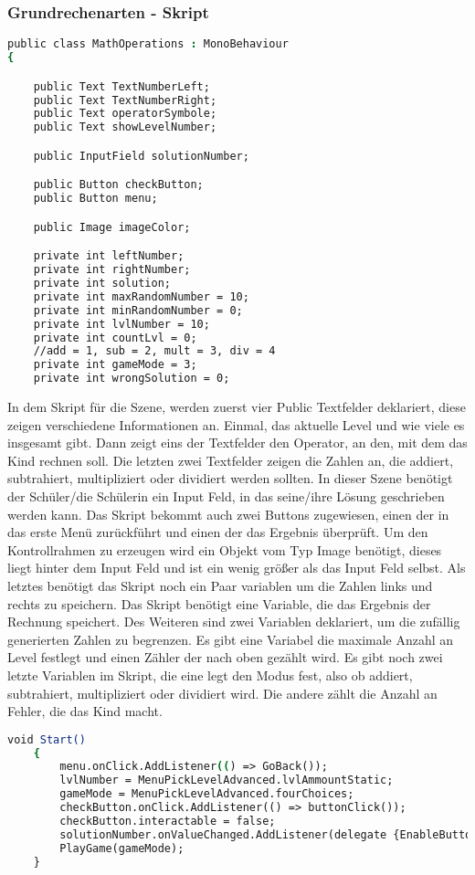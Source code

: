 \subsubsection{Grundrechenarten - Skript}
\begin{lstlisting}[language=csh, caption={MathOperations.cs Variablen Deklaration}]
public class MathOperations : MonoBehaviour
{

	public Text TextNumberLeft;
	public Text TextNumberRight;
	public Text operatorSymbole;
	public Text showLevelNumber;

	public InputField solutionNumber;

	public Button checkButton;
	public Button menu;

	public Image imageColor;

	private int leftNumber;
	private int rightNumber;
	private int solution;
	private int maxRandomNumber = 10;
	private int minRandomNumber = 0;
	private int lvlNumber = 10;
	private int countLvl = 0;
	//add = 1, sub = 2, mult = 3, div = 4
	private int gameMode = 3;
	private int wrongSolution = 0;
\end{lstlisting}
In dem Skript für die Szene, werden zuerst vier Public Textfelder deklariert, diese zeigen verschiedene Informationen an. Einmal, das aktuelle Level und wie viele es insgesamt gibt. Dann zeigt eins der Textfelder den Operator, an den, mit dem das Kind rechnen soll. Die letzten zwei Textfelder zeigen die Zahlen an, die addiert, subtrahiert, multipliziert oder dividiert werden sollten. In dieser Szene benötigt der Schüler/die Schülerin ein Input Feld, in das seine/ihre Lösung geschrieben werden kann. Das Skript bekommt auch zwei Buttons zugewiesen, einen der in das erste Menü zurückführt und einen der das Ergebnis überprüft. Um den Kontrollrahmen zu erzeugen wird ein Objekt vom Typ Image benötigt, dieses liegt hinter dem Input Feld und ist ein wenig größer als das Input Feld selbst. Als letztes benötigt das Skript noch ein Paar variablen um die Zahlen links und rechts zu speichern. Das Skript benötigt eine Variable, die das Ergebnis der Rechnung speichert. Des Weiteren sind zwei Variablen deklariert, um die zufällig generierten Zahlen zu begrenzen. Es gibt eine Variabel die maximale Anzahl an Level festlegt und einen Zähler der nach oben gezählt wird. Es gibt noch zwei letzte Variablen im Skript, die eine legt den Modus fest, also ob addiert, subtrahiert, multipliziert oder dividiert wird. Die andere zählt die Anzahl an Fehler, die das Kind macht.\\
\begin{lstlisting}[language=csh, caption={MathOperations.cs Start Funktion}]
	void Start()
	{
		menu.onClick.AddListener(() => GoBack());
		lvlNumber = MenuPickLevelAdvanced.lvlAmmountStatic;
		gameMode = MenuPickLevelAdvanced.fourChoices;
		checkButton.onClick.AddListener(() => buttonClick());
		checkButton.interactable = false;
		solutionNumber.onValueChanged.AddListener(delegate {EnableButton(); });
		PlayGame(gameMode);
	}
\end{lstlisting}
